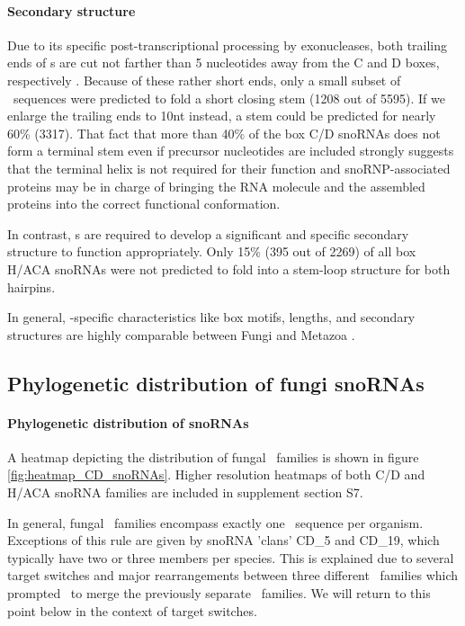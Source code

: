 \paragraph{\textbf{Secondary structure}} Due to its specific
post-transcriptional processing by exonucleases, both trailing ends of
\cd s are cut not farther than 5 nucleotides away from the C and D
boxes, respectively \citep{Kishore:2013}. Because of these rather
short ends, only a small subset of \sno\ sequences were predicted to
fold a short closing stem (1208 out of 5595).  If we enlarge the
trailing ends to 10nt instead, a stem could be predicted for nearly
60\% (3317). That fact that more than 40\% of the box C/D snoRNAs does
not form a terminal stem even if precursor nucleotides are included
strongly suggests that the terminal helix is not required for their
function and snoRNP-associated proteins may be in charge of bringing
the RNA molecule and the assembled proteins into the correct
functional conformation.

In contrast, \haca s are required to develop a significant and
specific secondary structure to function appropriately. Only 15\% (395
out of 2269) of all box H/ACA snoRNAs were not predicted to fold into
a stem-loop structure for both hairpins.


In general, \sno -specific characteristics like box motifs, lengths,
and secondary structures are highly comparable between Fungi and
Metazoa \cite{Kehr:2014}.

\subsection{Phylogenetic distribution of fungi snoRNAs}
  
\paragraph{\textbf{Phylogenetic distribution of snoRNAs}}
A heatmap depicting the distribution of fungal \cd\ families is shown
in figure \ref{fig:heatmap_CD_snoRNAs}. Higher resolution heatmaps of
both C/D and H/ACA snoRNA families are included in supplement section
S7.

In general, fungal \sno\ families encompass exactly one \sno\ sequence
per organism. Exceptions of this rule are given by snoRNA 'clans'
CD\_5 and CD\_19, which typically have two or three members per
species.  This is explained due to several target switches and major
rearrangements between three different \sno\ families which prompted
\snostrip\ to merge the previously separate \sno\ families. We will
return to this point below in the context of target switches.

